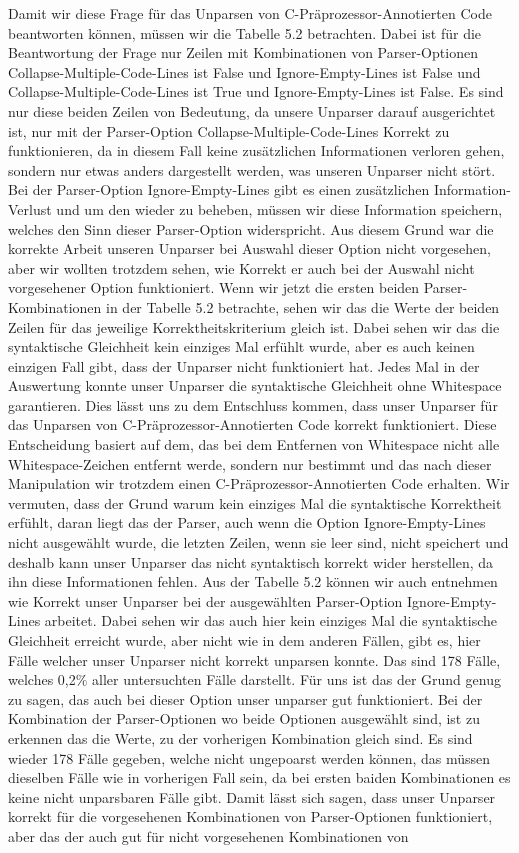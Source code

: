 Damit wir diese Frage für das Unparsen von C-Präprozessor-Annotierten Code beantworten können, müssen wir die Tabelle 5.2 betrachten. Dabei ist für die Beantwortung der Frage nur Zeilen mit Kombinationen von Parser-Optionen Collapse-Multiple-Code-Lines ist False und Ignore-Empty-Lines ist False und Collapse-Multiple-Code-Lines ist True und Ignore-Empty-Lines ist False. Es sind nur diese beiden Zeilen von Bedeutung, da unsere Unparser darauf ausgerichtet ist, nur mit der Parser-Option Collapse-Multiple-Code-Lines Korrekt zu funktionieren, da in diesem Fall keine zusätzlichen Informationen verloren gehen, sondern nur etwas anders dargestellt werden, was unseren Unparser nicht stört. Bei der Parser-Option Ignore-Empty-Lines gibt es einen zusätzlichen Information-Verlust und um den wieder zu beheben, müssen wir diese Information speichern, welches den Sinn dieser Parser-Option widerspricht. Aus diesem Grund war die korrekte Arbeit unseren Unparser bei Auswahl dieser Option nicht vorgesehen, aber wir wollten trotzdem sehen, wie Korrekt er auch bei der Auswahl nicht vorgesehener Option funktioniert. Wenn wir jetzt die ersten beiden Parser-Kombinationen in der Tabelle 5.2 betrachte, sehen wir das die Werte der beiden Zeilen für das jeweilige Korrektheitskriterium gleich ist. Dabei sehen wir das die syntaktische Gleichheit kein einziges Mal erfühlt wurde, aber es auch keinen einzigen Fall gibt, dass der Unparser nicht funktioniert hat. Jedes Mal in der Auswertung konnte unser Unparser die syntaktische Gleichheit ohne Whitespace garantieren. Dies lässt uns zu dem Entschluss kommen, dass unser Unparser für das Unparsen von C-Präprozessor-Annotierten Code korrekt funktioniert. Diese Entscheidung basiert auf dem, das bei dem Entfernen von Whitespace nicht alle Whitespace-Zeichen entfernt werde, sondern nur bestimmt und das nach dieser Manipulation wir trotzdem einen C-Präprozessor-Annotierten Code erhalten. Wir vermuten, dass der Grund warum kein einziges Mal die syntaktische Korrektheit erfühlt, daran liegt das der Parser, auch wenn die Option Ignore-Empty-Lines nicht ausgewählt wurde, die letzten Zeilen, wenn sie leer sind, nicht speichert und deshalb kann unser Unparser das nicht syntaktisch korrekt wider herstellen, da ihn diese Informationen fehlen. Aus der Tabelle 5.2 können wir auch entnehmen wie Korrekt unser Unparser  bei der ausgewählten Parser-Option Ignore-Empty-Lines arbeitet. Dabei sehen wir das auch hier kein einziges Mal die syntaktische Gleichheit erreicht wurde, aber nicht wie in dem anderen Fällen, gibt es, hier Fälle welcher unser Unparser nicht korrekt unparsen konnte. Das sind 178 Fälle, welches 0,2$\%$ aller untersuchten Fälle darstellt. Für uns ist das der Grund genug zu sagen, das auch bei dieser Option unser unparser gut funktioniert. Bei der Kombination der Parser-Optionen wo beide Optionen ausgewählt sind, ist zu erkennen das die Werte, zu der vorherigen Kombination gleich sind. Es sind wieder 178 Fälle gegeben, welche nicht ungepoarst werden können, das müssen dieselben Fälle wie in vorherigen Fall sein, da bei ersten baiden Kombinationen es keine nicht unparsbaren Fälle gibt. Damit lässt sich sagen, dass unser Unparser korrekt für die vorgesehenen Kombinationen von Parser-Optionen funktioniert, aber das der auch gut für nicht vorgesehenen Kombinationen von 